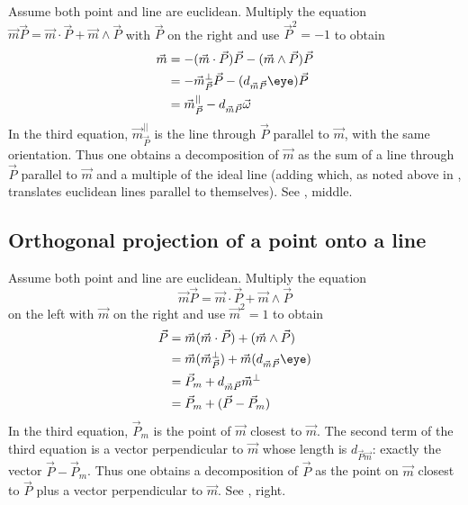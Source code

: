 \documentclass{birkjour}
\begin{document}
Assume both point and line are euclidean.
Multiply the equation $\vec{m}\vec{P} = \vec{m}\cdot \vec{P} + \vec{m} \wedge \vec{P}$ with $\vec{P}$ on the right and use $\vec{P}^{2}=-1$ to obtain 
\begin{align*}
\vec{m} &= -(\vec{m} \cdot \vec{P})\vec{P} - (\vec{m} \wedge \vec{P}) \vec{P} \\
&= -\vec{m}^{\perp}_{\vec{P}}\vec{P} - (d_{\vec{m}\vec{P}}\eye) \vec{P} \\
&= \vec{m}^{||}_{\vec{P}} - d_{\vec{m}\vec{P}} \vec{\omega} \\
\end{align*}
In the third equation, $\vec{m}^{||}_{\vec{P}}$ is the line through $\vec{P}$ parallel to $\vec{m}$, with the same orientation.  Thus one obtains a decomposition of $\vec{m}$ as the sum of a line through $\vec{P}$ parallel to $\vec{m}$ and a multiple of the ideal line (adding which, as noted above in , translates euclidean lines parallel to themselves). See , middle.

\vspace{-.05in}

\subsection{Orthogonal projection of a point onto a line}

Assume both point and line are euclidean.
Multiply the equation \[\vec{m}\vec{P} = \vec{m}\cdot \vec{P} + \vec{m} \wedge \vec{P}\] on the left with $\vec{m}$ on the right and use $\vec{m}^{2}=1$ to obtain 
\begin{align*}
\vec{P} &=  \vec{m}(\vec{m} \cdot \vec{P})+ (\vec{m} \wedge \vec{P}) \\
&= \vec{m} (\vec{m}^{\perp}_{\vec{P}})+  \vec{m}(d_{\vec{m}\vec{P}}\eye) \\
&= \vec{P}_{m} + d_{\vec{m}\vec{P}}\vec{m}^{\perp} \\
&= \vec{P}_{m} + (\vec{P} - \vec{P}_{m})
\end{align*}
In the third equation, $\vec{P}_{m}$ is the point of $\vec{m}$ closest to $\vec{m}$.  The second term of the third equation is a vector perpendicular to $\vec{m}$ whose length is $d_{\vec{P}\vec{m}}$:  exactly the vector $\vec{P} - \vec{P}_{m}$.
 Thus one obtains a decomposition of $\vec{P}$ as the point on $\vec{m}$ closest to $\vec{P}$   plus a vector perpendicular to $\vec{m}$. See , right.
\end{document}
